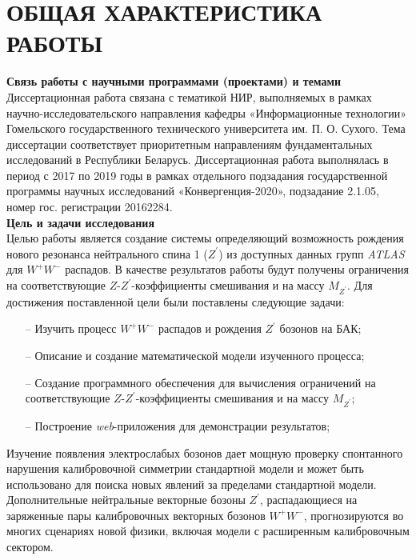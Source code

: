 \chapter*{ОБЩАЯ ХАРАКТЕРИСТИКА РАБОТЫ}
\textbf{Связь работы с научными программами (проектами) и темами}\\

Диссертационная работа связана с тематикой НИР, выполняемых в рамках научно-исследовательского направления кафедры «Информационные технологии» Гомельского государственного технического университета им. П. О. Сухого.
Тема диссертации соответствует приоритетным направлениям
фундаментальных исследований в Республики Беларусь. Диссертационная
работа выполнялась в период с 2017 по 2019 годы в рамках отдельного
подзадания государственной программы научных исследований
«Конвергенция-2020», подзадание 2.1.05, номер гос. регистрации 20162284.
\\

\textbf{Цель и задачи исследования}\\

Целью работы является создание системы определяющий возможность рождения нового резонанса нейтрального спина 1 (${Z}^{\prime}$) 
из доступных данных групп \textit{ATLAS} для ${W}^{+}{W}^{-}$ распадов. В качестве результатов работы будут получены 
ограничения на соответствующие $Z$-${Z}^{\prime}$-коэффициенты смешивания и на массу $M_{Z^\prime}$.
Для достижения поставленной цели были поставлены следующие задачи:

\begin{itemize}
	\item[--] Изучить процесс ${W}^{+}{W}^{-}$ распадов и рождения ${Z}^{\prime}$ бозонов на БАК;
	
	\item[--] Описание и создание математической модели изученного процесса;
	
	\item[--] Создание программного обеспечения для вычисления ограничений на соответствующие $Z$-${Z}^{\prime}$-коэффициенты смешивания и на массу $M_{Z^\prime}$;
	
	\item[--] Построение \textit{web}-приложения для демонстрации результатов;
	
\end{itemize}

Изучение появления электрослабых бозонов дает мощную проверку спонтанного нарушения 
калибровочной симметрии стандартной модели и может быть использовано для поиска новых явлений за пределами стандартной модели. 
Дополнительные нейтральные векторные бозоны ${Z}^{\prime}$, распадающиеся на заряженные пары калибровочных векторных бозонов ${W}^{+}{W}^{-}$, 
прогнозируются во многих сценариях новой физики, включая модели с расширенным калибровочным сектором.
\\

